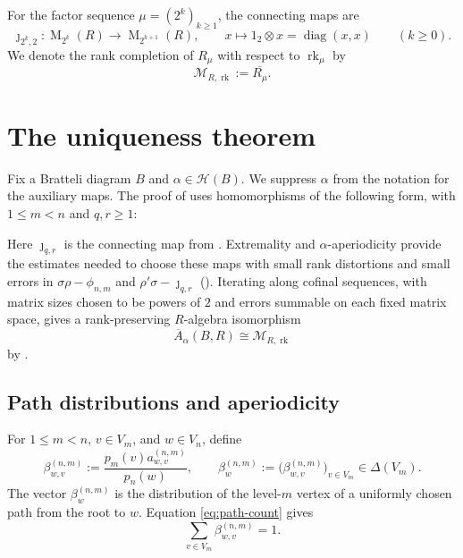 \documentclass[11pt]{amsart}
\DeclareMathOperator{\rk}{rk}
\DeclareMathOperator{\Mat}{M}
\DeclareMathOperator{\diag}{diag}
\theoremstyle{definition}
\theoremstyle{remark}
\begin{document}
For the factor sequence $\mu=(2^k)_{k\geq1}$, the connecting maps are
\begin{equation}\label{eq:dyadic-system}
 \jmath_{2^k,2}\colon\Mat_{2^k}(R)\longrightarrow\Mat_{2^{k+1}}(R),
 \qquad x\longmapsto1_2\otimes x=\diag(x,x)
 \qquad(k\geq0).
\end{equation}
We denote the rank completion of $R_\mu$ with respect to
$\rk_\mu$ by
\[
 \mathcal M_{R,\rk}:=\overline{R_\mu}.
\]

\section{The uniqueness theorem}\label{sec:uniqueness}

Fix a Bratteli diagram $B$ and $\alpha\in\mathcal H(B)$.
We suppress $\alpha$ from the notation for the auxiliary maps.
The proof of  uses homomorphisms of the
following form, with $1\leq m<n$ and $q,r\geq1$:
\begin{center}
\end{center}
Here $\jmath_{q,r}$ is the connecting map from
.
Extremality and $\alpha$-aperiodicity provide the estimates needed
to choose these maps with small rank distortions and small errors in
$\sigma\rho-\phi_{n,m}$ and $\rho'\sigma-\jmath_{q,r}$
().
Iterating along cofinal sequences, with matrix sizes chosen to be
powers of $2$ and errors summable on each fixed matrix space,
gives a rank-preserving $R$-algebra isomorphism
\[
 \overline A_\alpha(B,R)\cong\mathcal M_{R,\rk}
\]
by .

\subsection{Path distributions and aperiodicity}\label{subsec:asymptotic-homogeneity}

For $1\leq m<n$, $v\in V_m$, and $w\in V_n$, define
\begin{equation}\label{eq:beta}
 \beta_{w,v}^{(n,m)}
 :=\frac{p_m(v)a_{w,v}^{(n,m)}}{p_n(w)},
 \qquad
 \beta_w^{(n,m)}
 :=\bigl(\beta_{w,v}^{(n,m)}\bigr)_{v\in V_m}
 \in\Delta(V_m).
\end{equation}
The vector $\beta_w^{(n,m)}$ is the distribution of the level-$m$ vertex
of a uniformly chosen path from the root to $w$.
Equation \eqref{eq:path-count} gives
\[
 \sum_{v\in V_m}\beta_{w,v}^{(n,m)}=1.
\]
\end{document}
